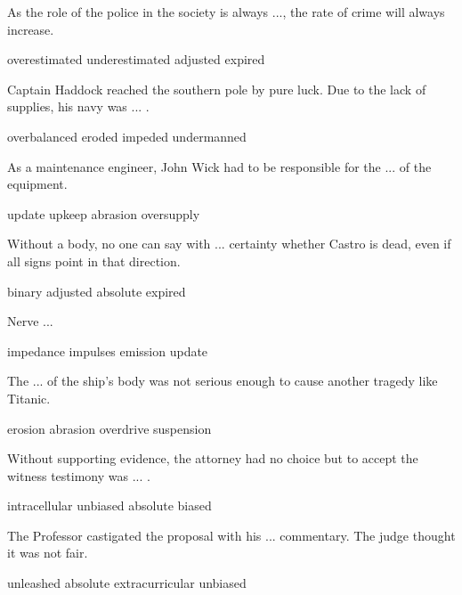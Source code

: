 \documentclass{exam}
\begin{document}
\begin{questions}
\question As the role of the police in the society is always ..., the rate of crime will always increase.\\
\begin{oneparchoices}
\choice overestimated
 \correctchoice underestimated
 \choice adjusted
 \choice expired 
\end{oneparchoices}


\question Captain Haddock reached the southern pole by pure luck. Due to the lack of supplies, his navy was ... .\\
\begin{oneparchoices}
\choice overbalanced 
 \choice eroded
 \choice impeded 
 \correctchoice undermanned
\end{oneparchoices}

\question As a maintenance engineer, John Wick had to be responsible for the ... of the equipment.\\
\begin{oneparchoices}
\choice update 
\correctchoice upkeep
 \choice abrasion 
 \choice oversupply 
\end{oneparchoices}
\question Without a body, no one can say with ... certainty whether Castro is dead, even if all signs point in that direction.\\
\begin{oneparchoices}
\choice binary
\choice adjusted
\correctchoice absolute
\choice expired 
\end{oneparchoices}
\question Nerve ...\\
\begin{oneparchoices}
\choice impedance 
\correctchoice impulses
\choice emission 
\choice update
\end{oneparchoices}
\question The ... of the ship's body was not serious enough to cause another tragedy like Titanic.\\
\begin{oneparchoices} 
\correctchoice erosion
 \choice abrasion 
 \choice overdrive
 \choice suspension
\end{oneparchoices}

\question Without supporting evidence, the attorney had no choice but to accept the witness testimony was ... .
\\
\begin{oneparchoices} 
\choice intracellular
 \choice unbiased
\correctchoice absolute
 \choice biased 
\end{oneparchoices}

\question The Professor castigated the proposal with his ... commentary. The judge thought it was not fair.\\
\begin{oneparchoices} 
\choice unleashed
\choice absolute
\choice extracurricular
\correctchoice unbiased
\end{oneparchoices}




\end{questions}
\end{document}
